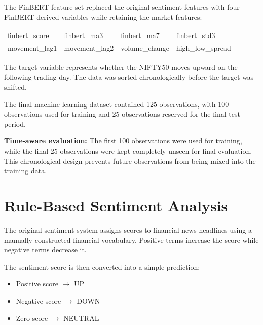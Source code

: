 \documentclass[10pt,a4paper]{article}
\begin{document}
	The FinBERT feature set replaced the original sentiment features with
	four FinBERT-derived variables while retaining the market features:
	
	\begin{center}
		\small
		\begin{tabular}{>{\ttfamily}llll}
			finbert\_score &
			finbert\_ma3 &
			finbert\_ma7 &
			finbert\_std3 \\
			
			movement\_lag1 &
			movement\_lag2 &
			volume\_change &
			high\_low\_spread
		\end{tabular}
	\end{center}
	
	The target variable represents whether the NIFTY50 moves upward on the
	following trading day. The data was sorted chronologically before the
	target was shifted.
	
	The final machine-learning dataset contained 125 observations, with
	100 observations used for training and 25 observations reserved for the
	final test period.
	
	\begin{resultbox}
		\textbf{\color{Orange}Time-aware evaluation:}
		The first 100 observations were used for training, while the final
		25 observations were kept completely unseen for final evaluation.
		This chronological design prevents future observations from being
		mixed into the training data.
	\end{resultbox}
	
	\section{Rule-Based Sentiment Analysis}
	
	The original sentiment system assigns scores to financial news
	headlines using a manually constructed financial vocabulary. Positive
	terms increase the score while negative terms decrease it.
	
	The sentiment score is then converted into a simple prediction:
	
	\begin{itemize}[leftmargin=*]
		\item Positive score $\rightarrow$ UP
		\item Negative score $\rightarrow$ DOWN
		\item Zero score $\rightarrow$ NEUTRAL
	\end{itemize}
	
\end{document}
